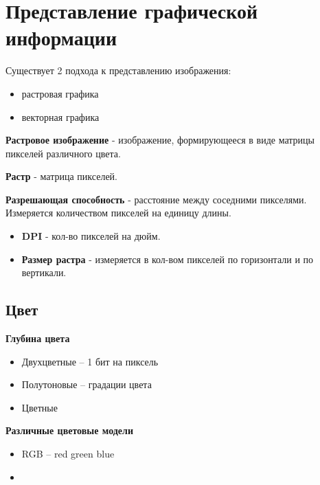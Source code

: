\section{Представление графической информации}

Существует 2 подхода к представлению изображения:
\begin{itemize}
  \item растровая графика
  \item векторная графика
\end{itemize}

\begin{definition}
  \textbf{Растровое изображение} - изображение, формирующееся в виде матрицы пикселей различного цвета.
\end{definition}

\begin{definition}
  \textbf{Растр} - матрица пикселей.
\end{definition}

\begin{definition}
  \textbf{Разрешающая способность} - расстояние между соседними пикселями. Измеряется количеством пикселей на единицу длины.
\end{definition}

\begin{itemize}
  \item \textbf{DPI} - кол-во пикселей на дюйм.
  \item \textbf{Размер растра} - измеряется в кол-вом пикселей по горизонтали и по вертикали. 
\end{itemize}

\subsection{Цвет}

\textbf{Глубина цвета}
\begin{itemize}
  \item Двухцветные -- 1 бит на пиксель 
  \item Полутоновые -- градации цвета
  \item Цветные
\end{itemize}

\textbf{Различные цветовые модели} 
\begin{itemize}
  \item RGB -- red green blue 
  \item 
\end{itemize}

